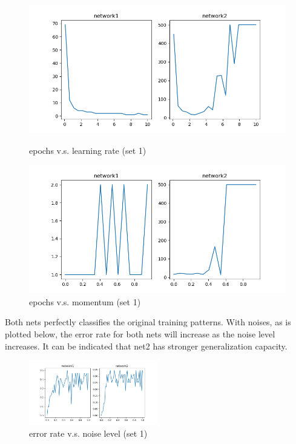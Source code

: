 \documentclass{article}
\begin{document}
\begin{figure}[!ht]
    \begin{minipage}{0.5\textwidth}
        \centering
        \includegraphics[width=\linewidth]{part1set1.png} 
        \caption{epochs v.s. learning rate (set 1)}   
    \end{minipage}\hfill
    \begin{minipage}{0.5\textwidth}
        \centering
        \includegraphics[width=\linewidth]{part1set1m.png}    
        \caption{epochs v.s. momentum (set 1)}
    \end{minipage}
\end{figure}

Both nets perfectly classifies the original training patterns. With noises, as is plotted below, the error rate for both nets will increase as the noise level increases. It can be indicated that net2 has stronger generalization capacity.
\begin{figure}[!ht]
    \centering
    \includegraphics[width=0.5\textwidth]{part1set1g.png}
    \caption{error rate v.s. noise level (set 1)}
\end{figure}
\end{document}
